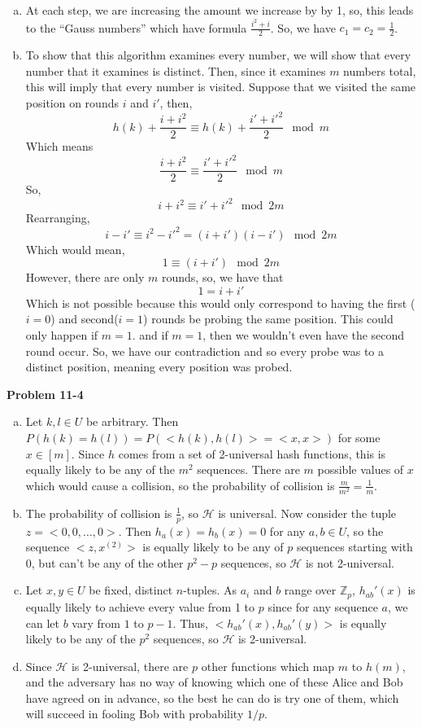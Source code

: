 \documentclass{article}
\begin{document}
\begin{enumerate}[a.]
\item
At each step, we are increasing the amount we increase by by 1, so, this leads to the ``Gauss numbers'' which have formula $\frac{i^2+i}{2}$. So, we have $c_1 = c_2 = \frac{1}{2}$.

\item

To show that this algorithm examines every number, we will show that every number that it examines is distinct. Then, since it examines $m$ numbers total, this will imply that every number is visited. Suppose that we visited the same position on rounds $i$ and $i'$, then,
\[
h(k) + \frac{i+i^2}{2} \equiv h(k) + \frac{i'+i'^2}{2} \mod m
\]
Which means
\[
 \frac{i+i^2}{2} \equiv\frac{i'+i'^2}{2} \mod m
\]
So,
\[
 i+i^2 \equiv i'+i'^2 \mod 2m
\]
Rearranging,
\[
 i - i' \equiv i^2 - i'^2 = (i+i')(i-i') \mod 2m
\]
Which would mean,
\[
1 \equiv(i+i') \mod 2m
\]
However, there are only $m$ rounds, so, we have that
\[
1 = i+i'
\]
Which is not possible because this would only correspond to having the first ($i=0$) and second($i=1$) rounds be probing the same position. This could only happen if $m=1$. and if $m=1$, then we wouldn't even have the second round occur. So, we have our contradiction and so every probe was to a distinct position, meaning every position was probed.
\end{enumerate}

\noindent\textbf{Problem 11-4}\\
\begin{enumerate}[a.]
\item Let $k, l \in U$ be arbitrary.  Then $P(h(k) = h(l)) = P(<h(k),h(l)> = <x,x>)$ for some $x \in [m]$.  Since $h$ comes from a set of 2-universal hash functions, this is equally likely to be any of the $m^2$ sequences.  There are $m$ possible values of $x$ which would cause a collision, so the probability of collision is $\frac{m}{m^2} = \frac{1}{m}$. 

\item The probability of collision is $\frac{1}{p}$, so $\mathcal{H}$ is universal.  Now consider the tuple $z = <0,0,\ldots, 0>$.  Then $h_a(x) = h_b(x) = 0$ for any $a, b \in U$, so the sequence $<z, x^{(2)}>$ is equally likely to be any of $p$ sequences starting with $0$, but can't be any of the other $p^{2} - p$ sequences, so $\mathcal{H}$ is not 2-universal. 

\item Let $x, y \in U$ be fixed, distinct $n$-tuples.  As $a_i$ and $b$ range over $\mathbb{Z}_p$, $h_{ab}'(x)$ is equally likely to achieve every value from 1 to $p$ since for any sequence $a$, we can let $b$ vary from $1$ to $p-1$. Thus, $<h_{ab}'(x), h_{ab}'(y)>$ is equally likely to be any of the $p^2$ sequences, so $\mathcal{H}$ is 2-universal. 

\item Since $\mathcal{H}$ is 2-universal, there are $p$ other functions which map $m$ to $h(m)$, and the adversary has no way of knowing which one of these Alice and Bob have agreed on in advance, so the best he can do is try one of them, which will succeed in fooling Bob with probability $1/p$. 
\end{enumerate}
\end{document}
